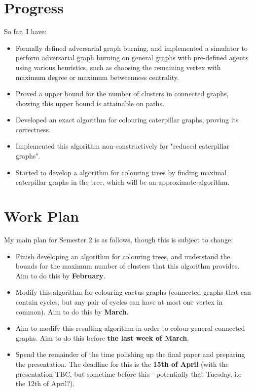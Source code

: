 \documentclass{mprop}
\begin{document}
\section{Progress}

So far, I have:

\begin{itemize}
    \item Formally defined adversarial graph burning, and implemented a simulator to perform adversarial graph burning on general graphs with pre-defined agents using various heuristics, such as choosing the remaining vertex with maximum degree or maximum betweenness centrality.
    \item Proved a upper bound for the number of clusters in connected graphs, showing this upper bound is attainable on paths.
    \item Developed an exact algorithm for colouring caterpillar graphs, proving its correctness.
    \item Implemented this algorithm non-constructively for "reduced caterpillar graphs".
    \item Started to develop a algorithm for colouring trees by finding maximal caterpillar graphs in the tree, which will be an approximate algorithm.
\end{itemize}

\section{Work Plan}

My main plan for Semester 2 is as follows, though this is subject to change:

\begin{itemize}
    \item Finish developing an algorithm for colouring trees, and understand the bounds for the maximum number of clusters that this algorithm provides. Aim to do this by \textbf{February}.
    \item Modify this algorithm for colouring cactus graphs (connected graphs that can contain cycles, but any pair of cycles can have at most one vertex in common). Aim to do this by \textbf{March}.
    \item Aim to modify this resulting algorithm in order to colour general connected graphs. Aim to do this before \textbf{the last week of March}.
    \item Spend the remainder of the time polishing up the final paper and preparing the presentation. The deadline for this is the \textbf{15th of April} (with the presentation TBC, but sometime before this - potentially that Tuesday, i.e the 12th of April?).
\end{itemize}



\end{document}
